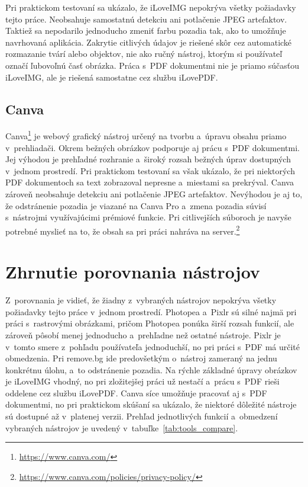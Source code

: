 Pri praktickom testovaní sa ukázalo, že iLoveIMG nepokrýva všetky požiadavky tejto práce. Neobsahuje samostatnú detekciu ani potlačenie JPEG artefaktov. Taktiež sa nepodarilo jednoducho zmeniť farbu pozadia tak, ako to umožňuje navrhovaná aplikácia. Zakrytie citlivých údajov je riešené skôr cez automatické rozmazanie tvárí alebo objektov, nie ako ručný nástroj, ktorým si používateľ označí ľubovoľnú časť obrázka. Práca s~PDF dokumentmi nie je priamo súčasťou iLoveIMG, ale je riešená samostatne cez službu iLovePDF.

\subsection{Canva}

Canva\footnote{\url{https://www.canva.com/}} je webový grafický nástroj určený na tvorbu a~úpravu obsahu priamo v~prehliadači. Okrem bežných obrázkov podporuje aj prácu s~PDF dokumentmi. Jej výhodou je prehľadné rozhranie a~široký rozsah bežných úprav dostupných v~jednom prostredí. Pri praktickom testovaní sa však ukázalo, že pri niektorých PDF dokumentoch sa text zobrazoval nepresne a~miestami sa prekrýval. Canva zároveň neobsahuje detekciu ani potlačenie JPEG artefaktov. Nevýhodou je aj to, že odstránenie pozadia je viazané na Canva Pro a~zmena pozadia súvisí s~nástrojmi využívajúcimi prémiové funkcie. Pri citlivejších súboroch je navyše potrebné myslieť na to, že obsah sa pri práci nahráva na server.\footnote{\url{https://www.canva.com/policies/privacy-policy/}}

\section{Zhrnutie porovnania nástrojov}

Z~porovnania je vidieť, že žiadny z~vybraných nástrojov nepokrýva všetky požiadavky tejto práce v~jednom prostredí. Photopea a~Pixlr sú silné najmä pri práci s~rastrovými obrázkami, pričom Photopea ponúka širší rozsah funkcií, ale zároveň pôsobí menej jednoducho a~prehľadne než ostatné nástroje. Pixlr je v~tomto smere z~pohľadu používateľa jednoduchší, no pri práci s~PDF má určité obmedzenia. Pri remove.bg ide predovšetkým o~nástroj zameraný na jednu konkrétnu úlohu, a~to odstránenie pozadia. Na rýchle základné úpravy obrázkov je iLoveIMG vhodný, no pri zložitejšej práci už nestačí a~prácu s~PDF rieši oddelene cez službu iLovePDF. Canva síce umožňuje pracovať aj s~PDF dokumentmi, no pri praktickom skúšaní sa ukázalo, že niektoré dôležité nástroje sú dostupné až v~platenej verzii. Prehľad jednotlivých funkcií a~obmedzení vybraných nástrojov je uvedený v~tabuľke~\ref{tab:tools_compare}.

